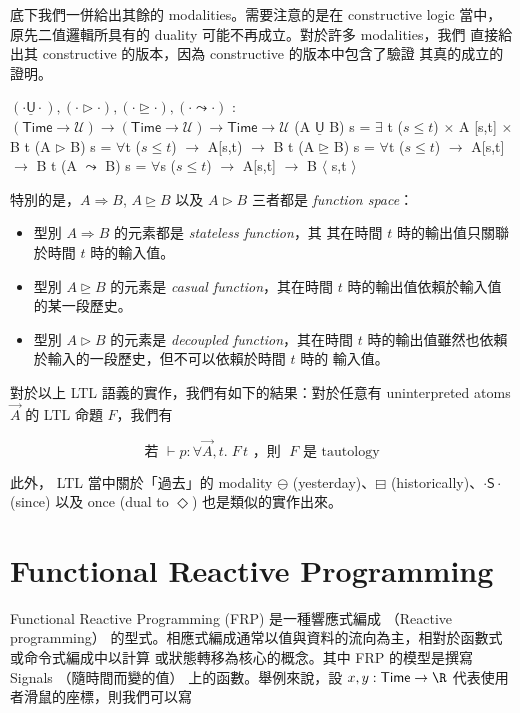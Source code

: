 \documentclass{article}
\newcommand{\Time}{\mathsf{Time}}
\newcommand{\TU}{\mathsf{U}}
\newcommand{\U}{\mathcal{U}}
\begin{document}
  底下我們一併給出其餘的 modalities。需要注意的是在 constructive logic
  當中，原先二值邏輯所具有的 duality 可能不再成立。對於許多 modalities，我們
  直接給出其 constructive 的版本，因為 constructive 的版本中包含了驗證
  其真的成立的證明。

  \begin{code}
  $(\cdot\underline{\TU}\cdot),(\cdot\rhd\cdot),(\cdot\unrhd\cdot),(\cdot\leadsto\cdot)$ : $(\Time\to\U)\to(\Time\to\U)\to\Time\to\U$
  (A $\underline{\TU}$ B) s = $\exists$ {t} ($s\le t$) $\times$ A [s,t] $\times$ B t
  (A $\rhd$ B) s = $\forall${t} ($s\le t$) $\to$ A[s,t) $\to$ B t
  (A $\unrhd$ B) s = $\forall${t} ($s\le t$) $\to$ A[s,t] $\to$ B t
  (A $\leadsto$ B) s = $\forall${s} ($s\le t$) $\to$ A[s,t] $\to$ B $\langle$ s,t $\rangle$
  \end{code}

  特別的是，$A\Rightarrow B$, $A\unrhd B$ 以及 $A\rhd B$ 三者都是
  \emph{function space}：

  \begin{itemize}
    \item 型別 $A\Rightarrow B$ 的元素都是 \emph{stateless function}，其
    其在時間 $t$ 時的輸出值只關聯於時間 $t$ 時的輸入值。

    \item 型別 $A\unrhd B$ 的元素是 \emph{casual function}，其在時間 $t$
    時的輸出值依賴於輸入值的某一段歷史。

    \item 型別 $A\rhd B$ 的元素是 \emph{decoupled function}，其在時間 $t$
    時的輸出值雖然也依賴於輸入的一段歷史，但不可以依賴於時間 $t$ 時的
    輸入值。
  \end{itemize}

  對於以上 LTL 語義的實作，我們有如下的結果：對於任意有 uninterpreted atoms
  $\overrightarrow{A}$ 的 LTL 命題 $F$，我們有

  \[ \text{若 } \vdash p:\forall{\overrightarrow{A}},t.\; F\,t \text{ ，則 } \;F \text{ 是 tautology}\]

  此外， LTL 當中關於「過去」的 modality $\ominus$ (yesterday)、$\boxminus$
  (historically)、$\cdot\mathsf{S}\cdot$ (since) 以及 once (dual to $\Diamond$)
  也是類似的實作出來。

\section{Functional Reactive Programming}
  Functional Reactive Programming (FRP) 是一種響應式編成
  （Reactive programming）
  的型式。相應式編成通常以值與資料的流向為主，相對於函數式或命令式編成中以計算
  或狀態轉移為核心的概念。其中 FRP 的模型是撰寫 Signals （隨時間而變的值）
  上的函數。舉例來說，設 $x,y:\Time\to\R$ 代表使用者滑鼠的座標，則我們可以寫
\end{document}
